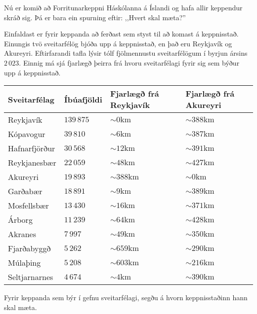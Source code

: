 
Nú er komið að Forritunarkeppni Háskólanna á Íslandi og hafa allir keppendur skráð sig.
Þá er bara ein spurning eftir: ,,Hvert skal mæta?''

Einfaldast er fyrir keppanda að ferðast sem styst til að komast á keppnisstað.
Einungis tvö sveitarfélög bjóða upp á keppnisstað, en það eru Reykjavík og Akureyri.
Eftirfarandi tafla lýsir tólf fjölmennustu sveitarfélögum í byrjun ársins $2\,023$.
Einnig má sjá fjarlægð þeirra frá hvoru sveitarfélagi fyrir sig sem býður upp á keppnisstað.

\begin{tabular}{|l|l|l|l|}
    \hline
    Sveitarfélag        & Íbúafjöldi & Fjarlægð frá Reykjavík & Fjarlægð frá Akureyri  \\ \hline
    Reykjavík           & $139\,875$ & $\sim   0 \mathrm{km}$ & $\sim 388 \mathrm{km}$ \\ \hline
    Kópavogur           &  $39\,810$ & $\sim   6 \mathrm{km}$ & $\sim 387 \mathrm{km}$ \\ \hline
    Hafnarfjörður       &  $30\,568$ & $\sim  12 \mathrm{km}$ & $\sim 391 \mathrm{km}$ \\ \hline
    Reykjanesbær        &  $22\,059$ & $\sim  48 \mathrm{km}$ & $\sim 427 \mathrm{km}$ \\ \hline
    Akureyri            &  $19\,893$ & $\sim 388 \mathrm{km}$ & $\sim   0 \mathrm{km}$ \\ \hline
    Garðabær            &  $18\,891$ & $\sim   9 \mathrm{km}$ & $\sim 389 \mathrm{km}$ \\ \hline
    Mosfellsbær         &  $13\,430$ & $\sim  16 \mathrm{km}$ & $\sim 371 \mathrm{km}$ \\ \hline
    Árborg              &  $11\,239$ & $\sim  64 \mathrm{km}$ & $\sim 428 \mathrm{km}$ \\ \hline
    Akranes             &   $7\,997$ & $\sim  49 \mathrm{km}$ & $\sim 350 \mathrm{km}$ \\ \hline
    Fjarðabyggð         &   $5\,262$ & $\sim 659 \mathrm{km}$ & $\sim 290 \mathrm{km}$ \\ \hline
    Múlaþing            &   $5\,208$ & $\sim 603 \mathrm{km}$ & $\sim 216 \mathrm{km}$ \\ \hline
    Seltjarnarnes       &   $4\,674$ & $\sim   4 \mathrm{km}$ & $\sim 390 \mathrm{km}$ \\ \hline
\end{tabular}

Fyrir keppanda sem býr í gefnu sveitarfélagi, segðu á hvorn keppnisstaðinn hann skal mæta.

